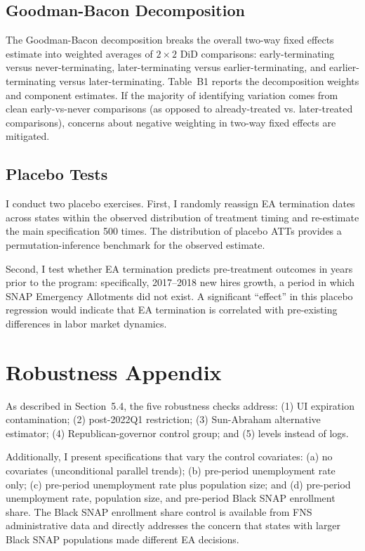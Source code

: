 \documentclass[12pt]{article}
\begin{document}
\subsection{Goodman-Bacon Decomposition}


The Goodman-Bacon \citep{goodmanbacon2021difference} decomposition breaks the overall two-way fixed effects estimate into weighted averages of $2 \times 2$ DiD comparisons: early-terminating versus never-terminating, later-terminating versus earlier-terminating, and earlier-terminating versus later-terminating. Table~B1 reports the decomposition weights and component estimates. If the majority of identifying variation comes from clean early-vs-never comparisons (as opposed to already-treated vs. later-treated comparisons), concerns about negative weighting in two-way fixed effects are mitigated.

\subsection{Placebo Tests}

I conduct two placebo exercises. First, I randomly reassign EA termination dates across states within the observed distribution of treatment timing and re-estimate the main specification 500 times. The distribution of placebo ATTs provides a permutation-inference benchmark for the observed estimate.

Second, I test whether EA termination predicts pre-treatment outcomes in years prior to the program: specifically, 2017--2018 new hires growth, a period in which SNAP Emergency Allotments did not exist. A significant ``effect'' in this placebo regression would indicate that EA termination is correlated with pre-existing differences in labor market dynamics.

\section{Robustness Appendix}
\label{sec:robustness}



As described in Section~5.4, the five robustness checks address: (1) UI expiration contamination; (2) post-2022Q1 restriction; (3) Sun-Abraham alternative estimator; (4) Republican-governor control group; and (5) levels instead of logs.

Additionally, I present specifications that vary the control covariates: (a) no covariates (unconditional parallel trends); (b) pre-period unemployment rate only; (c) pre-period unemployment rate plus population size; and (d) pre-period unemployment rate, population size, and pre-period Black SNAP enrollment share. The Black SNAP enrollment share control is available from FNS administrative data and directly addresses the concern that states with larger Black SNAP populations made different EA decisions.
\end{document}
